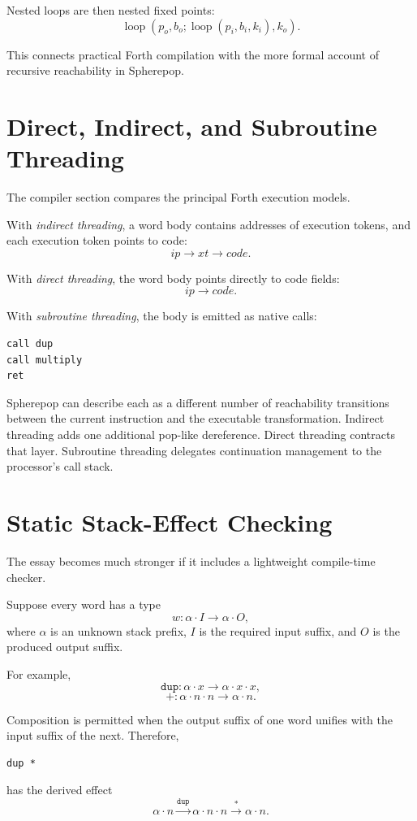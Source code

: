 \documentclass[12pt]{article}
\begin{document}
Nested loops are then nested fixed points:
\[
\operatorname{loop}(p_o, b_o; \operatorname{loop}(p_i,b_i,k_i), k_o).
\]

This connects practical Forth compilation with the more formal account of recursive reachability in Spherepop.

\section{Direct, Indirect, and Subroutine Threading}

The compiler section compares the principal Forth execution models.

With \emph{indirect threading}, a word body contains addresses of execution tokens, and each execution token points to code:
\[
ip \to xt \to code.
\]

With \emph{direct threading}, the word body points directly to code fields:
\[
ip \to code.
\]

With \emph{subroutine threading}, the body is emitted as native calls:
\begin{lstlisting}
call dup
call multiply
ret
\end{lstlisting}

Spherepop can describe each as a different number of reachability transitions between the current instruction and the executable transformation. Indirect threading adds one additional pop-like dereference. Direct threading contracts that layer. Subroutine threading delegates continuation management to the processor's call stack.

\section{Static Stack-Effect Checking}

The essay becomes much stronger if it includes a lightweight compile-time checker.

Suppose every word has a type
\[
w : \alpha\cdot I \longrightarrow \alpha\cdot O,
\]
where \(\alpha\) is an unknown stack prefix, \(I\) is the required input suffix, and \(O\) is the produced output suffix.

For example,
\[
\texttt{dup}: \alpha\cdot x \to \alpha\cdot x\cdot x,
\]
\[
\texttt{+}: \alpha\cdot n\cdot n \to \alpha\cdot n.
\]

Composition is permitted when the output suffix of one word unifies with the input suffix of the next. Therefore,
\begin{lstlisting}
dup *
\end{lstlisting}
has the derived effect
\[
\alpha\cdot n \xrightarrow{\texttt{dup}} \alpha\cdot n\cdot n \xrightarrow{\texttt{*}} \alpha\cdot n.
\]
\end{document}
